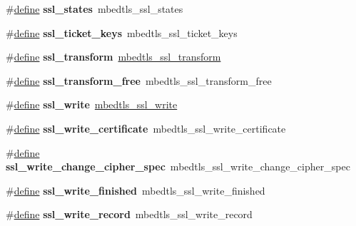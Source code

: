 \begin{DoxyCompactItemize}
\#\hyperlink{structdefine}{define} {\bfseries ssl\+\_\+states}~mbedtls\+\_\+ssl\+\_\+states
\item 
\mbox{\label{compat-1_83_8h_ab87271b1b85dd842143054c087b6b261}} 
\#\hyperlink{structdefine}{define} {\bfseries ssl\+\_\+ticket\+\_\+keys}~mbedtls\+\_\+ssl\+\_\+ticket\+\_\+keys
\item 
\mbox{\label{compat-1_83_8h_ac11d0a93de78e8264834d61387da035f}} 
\#\hyperlink{structdefine}{define} {\bfseries ssl\+\_\+transform}~\hyperlink{structmbedtls__ssl__transform}{mbedtls\+\_\+ssl\+\_\+transform}
\item 
\mbox{\label{compat-1_83_8h_a37e6f049a1d90375cba29b1b70b16312}} 
\#\hyperlink{structdefine}{define} {\bfseries ssl\+\_\+transform\+\_\+free}~mbedtls\+\_\+ssl\+\_\+transform\+\_\+free
\item 
\mbox{\label{compat-1_83_8h_a4b0a5d96aa56f5d098a6a812738469a8}} 
\#\hyperlink{structdefine}{define} {\bfseries ssl\+\_\+write}~\hyperlink{ssl_8h_a5bbda87d484de82df730758b475f32e5}{mbedtls\+\_\+ssl\+\_\+write}
\item 
\mbox{\label{compat-1_83_8h_a28f9aa80c61ed69cbe79ab926ce4f8ce}} 
\#\hyperlink{structdefine}{define} {\bfseries ssl\+\_\+write\+\_\+certificate}~mbedtls\+\_\+ssl\+\_\+write\+\_\+certificate
\item 
\mbox{\label{compat-1_83_8h_ab4fdbd31e56e771f9328906472df02f8}} 
\#\hyperlink{structdefine}{define} {\bfseries ssl\+\_\+write\+\_\+change\+\_\+cipher\+\_\+spec}~mbedtls\+\_\+ssl\+\_\+write\+\_\+change\+\_\+cipher\+\_\+spec
\item 
\mbox{\label{compat-1_83_8h_a356456d3c457d83ac7c6a014946d178a}} 
\#\hyperlink{structdefine}{define} {\bfseries ssl\+\_\+write\+\_\+finished}~mbedtls\+\_\+ssl\+\_\+write\+\_\+finished
\item 
\mbox{\label{compat-1_83_8h_a7683a1ef7d7e3e5cdda9ea3a4cc8466d}} 
\#\hyperlink{structdefine}{define} {\bfseries ssl\+\_\+write\+\_\+record}~mbedtls\+\_\+ssl\+\_\+write\+\_\+record
\item 
\mbox{\label{compat-1_83_8h_a2d61b3263438f4a3b724e27cb3c7eb76}} 

\end{DoxyCompactItemize}
